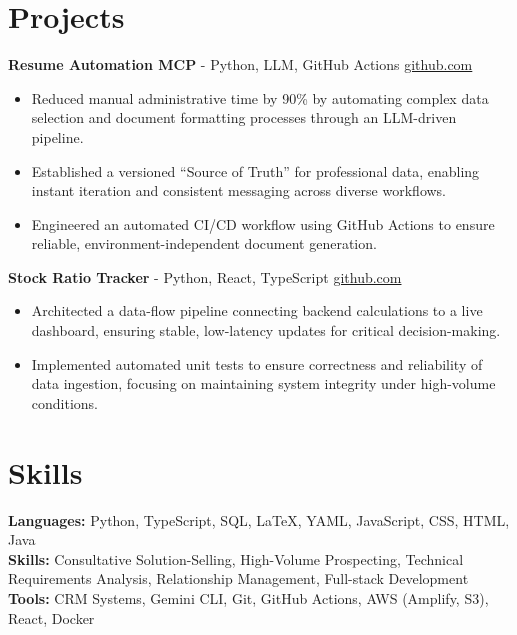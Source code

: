 \documentclass[11pt]{article}       %
\begin{document}
\section*{Projects}

\textbf{Resume Automation MCP}{ - Python, LLM, GitHub Actions} \hfill \href{https://github.com/Monica20030707/Tex_OrangeLeaf-mcp}{github.com} \\
\vspace{-9pt}
\begin{itemize}
  \item Reduced manual administrative time by 90\% by automating complex data selection and document formatting processes through an LLM-driven pipeline.
  \item Established a versioned ``Source of Truth'' for professional data, enabling instant iteration and consistent messaging across diverse workflows.
  \item Engineered an automated CI/CD workflow using GitHub Actions to ensure reliable, environment-independent document generation.
\end{itemize}

\textbf{Stock Ratio Tracker}{ - Python, React, TypeScript} \hfill \href{https://github.com/Monica20030707/tradingDashboard-UI}{github.com} \\
\vspace{-9pt}
\begin{itemize}
  \item Architected a data-flow pipeline connecting backend calculations to a live dashboard, ensuring stable, low-latency updates for critical decision-making. 
  \item Implemented automated unit tests to ensure correctness and reliability of data ingestion, focusing on maintaining system integrity under high-volume conditions.
\end{itemize}

\vspace{-18.5pt}

\section*{Skills}
\textbf{Languages:} Python, TypeScript, SQL, LaTeX, YAML, JavaScript, CSS, HTML, Java\\
\textbf{Skills:} Consultative Solution-Selling, High-Volume Prospecting, Technical Requirements Analysis, Relationship Management, Full-stack Development\\
\textbf{Tools:} CRM Systems, Gemini CLI, Git, GitHub Actions, AWS (Amplify, S3), React, Docker\\

\vspace{-6.5pt}
\end{document}

